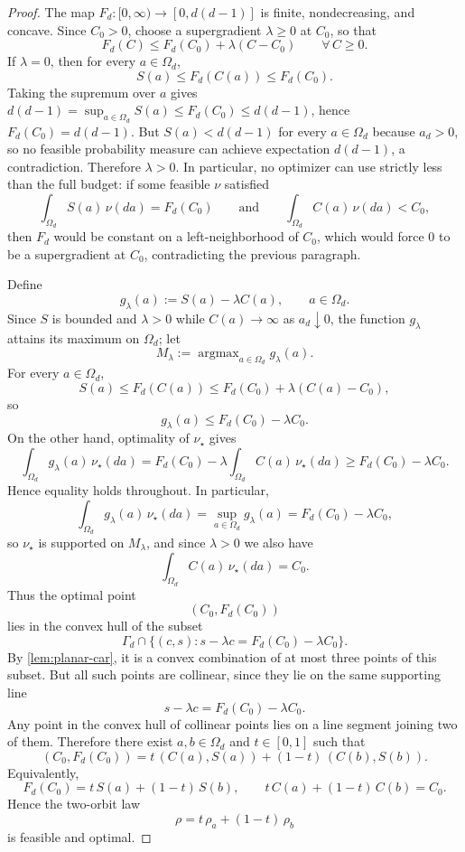 \documentclass[11pt]{amsart}
\theoremstyle{definition}
\DeclareMathOperator{\argmax}{argmax}
\begin{document}
\begin{proof}
The map $F_d:[0,\infty)\to[0,d(d-1)]$ is finite, nondecreasing, and concave. Since $C_0>0$, choose a supergradient $\lambda\ge 0$ at $C_0$, so that
\[
F_d(C)\le F_d(C_0)+\lambda(C-C_0)
\qquad \forall\, C\ge 0.
\]
If $\lambda=0$, then for every $a\in\Omega_d$,
\[
S(a)\le F_d(C(a))\le F_d(C_0).
\]
Taking the supremum over $a$ gives $d(d-1)=\sup_{a\in\Omega_d}S(a)\le F_d(C_0)\le d(d-1)$, hence $F_d(C_0)=d(d-1)$. But $S(a)<d(d-1)$ for every $a\in\Omega_d$ because $a_d>0$, so no feasible probability measure can achieve expectation $d(d-1)$, a contradiction. Therefore $\lambda>0$. In particular, no optimizer can use strictly less than the full budget: if some feasible $\nu$ satisfied
\[
\int_{\Omega_d} S(a)\,\nu(da)=F_d(C_0)
\qquad\text{and}\qquad
\int_{\Omega_d} C(a)\,\nu(da)<C_0,
\]
then $F_d$ would be constant on a left-neighborhood of $C_0$, which would force $0$ to be a supergradient at $C_0$, contradicting the previous paragraph.

Define
\[
g_\lambda(a):=S(a)-\lambda C(a),\qquad a\in\Omega_d.
\]
Since $S$ is bounded and $\lambda>0$ while $C(a)\to\infty$ as $a_d\downarrow 0$, the function $g_\lambda$ attains its maximum on $\Omega_d$; let
\[
M_\lambda:=\argmax_{a\in\Omega_d} g_\lambda(a).
\]
For every $a\in\Omega_d$,
\[
S(a)\le F_d(C(a))\le F_d(C_0)+\lambda(C(a)-C_0),
\]
so
\[
g_\lambda(a)\le F_d(C_0)-\lambda C_0.
\]
On the other hand, optimality of $\nu_\star$ gives
\[
\int_{\Omega_d} g_\lambda(a)\,\nu_\star(da)
=F_d(C_0)-\lambda\int_{\Omega_d} C(a)\,\nu_\star(da)
\ge F_d(C_0)-\lambda C_0.
\]
Hence equality holds throughout. In particular,
\[
\int_{\Omega_d} g_\lambda(a)\,\nu_\star(da)=\sup_{a\in\Omega_d} g_\lambda(a)=F_d(C_0)-\lambda C_0,
\]
so $\nu_\star$ is supported on $M_\lambda$, and since $\lambda>0$ we also have
\[
\int_{\Omega_d} C(a)\,\nu_\star(da)=C_0.
\]
Thus the optimal point
\[
(C_0,F_d(C_0))
\]
lies in the convex hull of the subset
\[
\Gamma_d\cap \{(c,s): s-\lambda c = F_d(C_0)-\lambda C_0\}.
\]
By \cref{lem:planar-car}, it is a convex combination of at most three points of this subset. But all such points are collinear, since they lie on the same supporting line
\[
s-\lambda c = F_d(C_0)-\lambda C_0.
\]
Any point in the convex hull of collinear points lies on a line segment joining two of them. Therefore there exist $a,b\in\Omega_d$ and $t\in[0,1]$ such that
\[
(C_0,F_d(C_0))=t\,(C(a),S(a))+(1-t)\,(C(b),S(b)).
\]
Equivalently,
\[
F_d(C_0)=t\,S(a)+(1-t)\,S(b),
\qquad
t\,C(a)+(1-t)\,C(b)=C_0.
\]
Hence the two-orbit law
\[
\rho=t\,\rho_a+(1-t)\,\rho_b
\]
is feasible and optimal.
\end{proof}
\end{document}
